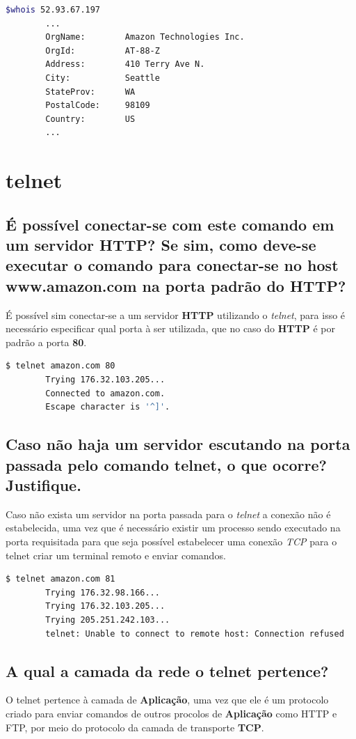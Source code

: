 \documentclass[12pt,a4paper]{report}
\begin{document}
\begin{lstlisting}[language=bash]
        $whois 52.93.67.197
        ... 
        OrgName:        Amazon Technologies Inc.
        OrgId:          AT-88-Z
        Address:        410 Terry Ave N.
        City:           Seattle
        StateProv:      WA
        PostalCode:     98109
        Country:        US
        ...
\end{lstlisting}





\section{telnet}
\subsection{É possível conectar-se com este comando em um servidor HTTP? Se sim, como deve-se executar o comando para conectar-se no host www.amazon.com na porta padrão do HTTP?}
É possível sim conectar-se a um servidor \textbf{HTTP} utilizando o \emph{telnet}, para isso é necessário especificar qual porta à ser utilizada, que no caso do \textbf{HTTP} é por padrão a porta \textbf{80}.
\begin{lstlisting}[language=bash]
        $ telnet amazon.com 80
        Trying 176.32.103.205...
        Connected to amazon.com.
        Escape character is '^]'.
\end{lstlisting}


\subsection{Caso não haja um servidor escutando na porta passada pelo comando telnet, o que ocorre? Justifique.}

Caso não exista um servidor na porta passada para o \emph{telnet} a conexão não é estabelecida, uma vez que é necessário existir um processo sendo executado na porta requisitada para que seja possível estabelecer uma conexão \emph{TCP} para o telnet criar um terminal remoto e enviar comandos.
\begin{lstlisting}[language=bash]
        $ telnet amazon.com 81
        Trying 176.32.98.166...
        Trying 176.32.103.205...
        Trying 205.251.242.103...
        telnet: Unable to connect to remote host: Connection refused
\end{lstlisting}



\subsection{A qual a camada da rede o telnet pertence?}
O telnet pertence à camada de \textbf{Aplicação}, uma vez que ele é um protocolo criado para enviar comandos de outros procolos de \textbf{Aplicação} como HTTP e FTP, por meio do protocolo da camada de transporte \textbf{TCP}. 
\end{document}
